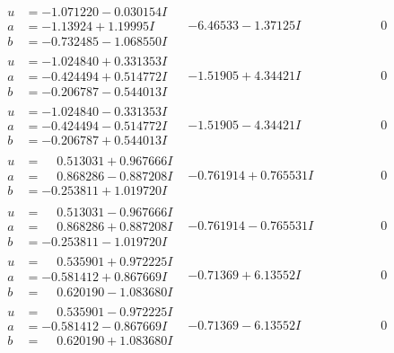 \documentclass[1p]{elsarticle_modified}
\theoremstyle{definition}
\begin{document}
$$\begin{array}{c|c|c}
\begin{aligned}
u &= -1.071220 - 0.030154 I \\
a &= -1.13924 + 1.19995 I \\
b &= -0.732485 - 1.068550 I\end{aligned}
 & -6.46533 - 1.37125 I & \phantom{-0.000000 } 0 \\ \hline\begin{aligned}
u &= -1.024840 + 0.331353 I \\
a &= -0.424494 + 0.514772 I \\
b &= -0.206787 - 0.544013 I\end{aligned}
 & -1.51905 + 4.34421 I & \phantom{-0.000000 } 0 \\ \hline\begin{aligned}
u &= -1.024840 - 0.331353 I \\
a &= -0.424494 - 0.514772 I \\
b &= -0.206787 + 0.544013 I\end{aligned}
 & -1.51905 - 4.34421 I & \phantom{-0.000000 } 0 \\ \hline\begin{aligned}
u &= \phantom{-}0.513031 + 0.967666 I \\
a &= \phantom{-}0.868286 - 0.887208 I \\
b &= -0.253811 + 1.019720 I\end{aligned}
 & -0.761914 + 0.765531 I & \phantom{-0.000000 } 0 \\ \hline\begin{aligned}
u &= \phantom{-}0.513031 - 0.967666 I \\
a &= \phantom{-}0.868286 + 0.887208 I \\
b &= -0.253811 - 1.019720 I\end{aligned}
 & -0.761914 - 0.765531 I & \phantom{-0.000000 } 0 \\ \hline\begin{aligned}
u &= \phantom{-}0.535901 + 0.972225 I \\
a &= -0.581412 + 0.867669 I \\
b &= \phantom{-}0.620190 - 1.083680 I\end{aligned}
 & -0.71369 + 6.13552 I & \phantom{-0.000000 } 0 \\ \hline\begin{aligned}
u &= \phantom{-}0.535901 - 0.972225 I \\
a &= -0.581412 - 0.867669 I \\
b &= \phantom{-}0.620190 + 1.083680 I\end{aligned}
 & -0.71369 - 6.13552 I & \phantom{-0.000000 } 0 \\ \hline\begin{aligned}

\end{aligned}
\end{array}$$
\end{document}
